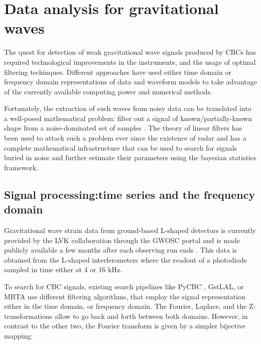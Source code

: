 \chapter{Data analysis for gravitational waves}\label{DA}

The quest for detection of weak gravitational wave signals produced by CBCs has required technological improvements in the instruments, and the usage of optimal filtering techinques. Different approaches have used either time domain or frequency domain representations of data and waveform models to take advantage of the currently available computing power and numerical methods.

Fortunately, the extraction of such waves from noisy data can be translated into a well-posed mathematical problem: filter out a signal of known/partially-known shape from a noise-dominated set of samples \cite{Maggiore:2007ulw, Creighton:2011zz, Sathyaprakash:2009xs}. The theory of linear filters has been used to attack such a problem ever since the existence of radar\cite{Wainstein:1962vrq} and has a complete mathematical infrastructure that can be used to search for signals buried in noise and further estimate their parameters using the bayesian statistics framework.



\section{Signal processing:time series and the frequency domain}

Gravitational wave strain data from ground-based L-shaped detectors is currently provided by the LVK collaboration through the GWOSC portal and is made publicly available a few months after each observing run ends \cite[section-3]{LIGOScientific:2019lzm}. This data is obtained from the L-shaped interferometers where the readout of a photodiode sampled in time either at 4 or 16 kHz.



To search for CBC signals, existing search pipelines like PyCBC \cite{Usman:2015kfa}, GstLAL\cite{Sachdev:2019vvd}, or MBTA\cite{Aubin:2020goo} use different filtering algorithms, that employ the signal representation either in the time domain, or frequency domain. The Fourier, Laplace, and the Z-transformations allow to go back and forth between both domains. However, in contrast to the other two, the Fourier transform is given by a simpler bijective mapping:

